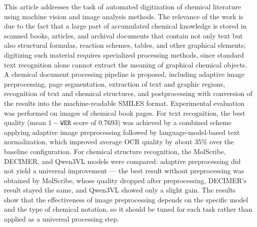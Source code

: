 This article addresses the task of automated digitization of chemical literature using machine vision and image analysis methods. The relevance of the work is due to the fact that a large part of accumulated chemical knowledge is stored in scanned books, articles, and archival documents that contain not only text but also structural formulas, reaction schemes, tables, and other graphical elements; digitizing such material requires specialized processing methods, since standard text recognition alone cannot extract the meaning of graphical chemical objects.
A chemical document processing pipeline is proposed, including adaptive image preprocessing, page segmentation, extraction of text and graphic regions, recognition of text and chemical structures, and postprocessing with conversion of the results into the machine-readable SMILES format.
Experimental evaluation was performed on images of chemical book pages. For text recognition, the best quality (mean $1-\mathtt{WER}$ score of 0.7693) was achieved by a combined scheme applying adaptive image preprocessing followed by language-model-based text normalization, which improved average OCR quality by about 35\% over the baseline configuration. For chemical structure recognition, the MolScribe, DECIMER, and Qwen3VL models were compared: adaptive preprocessing did not yield a universal improvement --- the best result without preprocessing was obtained by MolScribe, whose quality dropped after preprocessing, DECIMER's result stayed the same, and Qwen3VL showed only a slight gain.
The results show that the effectiveness of image preprocessing depends on the specific model and the type of chemical notation, so it should be tuned for each task rather than applied as a universal processing step.
